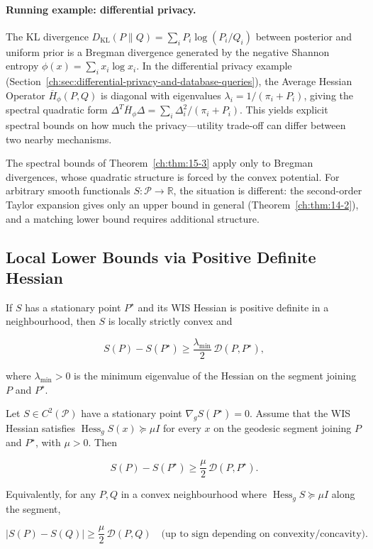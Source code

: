 \paragraph{Running example: differential privacy.}
The KL divergence $D_{\mathrm{KL}}(P\|Q)=\sum_i P_i\log(P_i/Q_i)$ between posterior and uniform prior is a Bregman divergence generated by the negative Shannon entropy $\phi(x)=\sum_i x_i\log x_i$.  In the differential privacy example (Section~\ref{ch:sec:differential-privacy-and-database-queries}), the Average Hessian Operator $\overline H_\phi(P,Q)$ is diagonal with eigenvalues $\lambda_i=1/(\pi_i+P_i)$, giving the spectral quadratic form $\Delta^T\overline H_\phi\Delta=\sum_i\Delta_i^2/(\pi_i+P_i)$.  This yields explicit spectral bounds on how much the privacy---utility trade-off can differ between two nearby mechanisms.

The spectral bounds of Theorem~\ref{ch:thm:15-3} apply only to Bregman
divergences, whose quadratic structure is forced by the convex
potential.  For arbitrary smooth functionals $S:\mathcal P\to\mathbb R$,
the situation is different: the second-order Taylor expansion gives
only an upper bound in general (Theorem~\ref{ch:thm:14-2}), and a
matching lower bound requires additional structure.

\subsection{Local Lower Bounds via Positive Definite Hessian}\label{ch:sec:local-lower-bounds-via-positive-definite-hessian}

If $S$ has a stationary point $P^\star$ and its WIS Hessian is positive
definite in a neighbourhood, then $S$ is locally strictly convex and

\[
S(P) - S(P^\star) \ge \frac{\lambda_{\min}}{2}\,\mathcal D(P,P^\star),
\]

where $\lambda_{\min}>0$ is the minimum eigenvalue of the Hessian on the
segment joining $P$ and $P^\star$.

\begin{theorem}
\label{ch:thm:lower-local}
Let $S\in C^2(\mathcal P)$ have a stationary point $\nabla_g S(P^\star)=0$.
Assume that the WIS Hessian satisfies
$\operatorname{Hess}_g S(x) \succeq \mu I$ for every $x$ on the
geodesic segment joining $P$ and $P^\star$, with $\mu>0$.  Then

\[
S(P) - S(P^\star) \ge \frac{\mu}{2}\,\mathcal D(P,P^\star).
\]

Equivalently, for any $P,Q$ in a convex neighbourhood where
$\operatorname{Hess}_g S \succeq \mu I$ along the segment,

\[
|S(P)-S(Q)| \ge \frac{\mu}{2}\,\mathcal D(P,Q)
\quad\text{(up to sign depending on convexity/concavity)}.
\]

\end{theorem}

